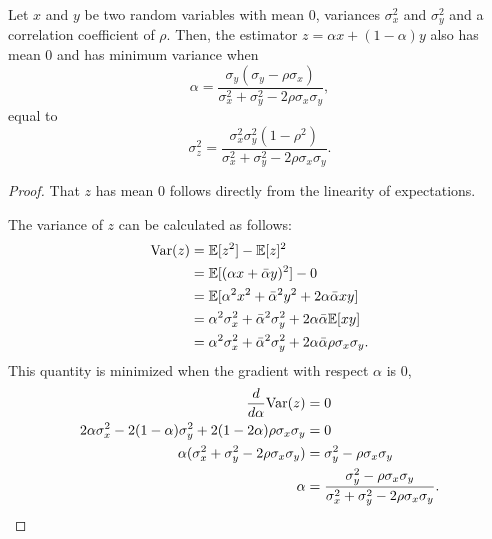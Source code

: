 \begin{lemma}
  Let $x$ and $y$ be two random variables with mean $0$, variances $\sigma^2_x$ and $\sigma^2_y$ and a correlation coefficient of $\rho$.
  Then, the estimator $z = \alpha x + (1-\alpha) y$ also has mean $0$ and has minimum variance when
  $$\alpha = \frac{\sigma_y (\sigma_y - \rho \sigma_x)}{\sigma_x^2 + \sigma_y^2 - 2\rho \sigma_x \sigma_y},$$
  equal to
  $$\sigma^2_z = \frac{\sigma_x^2 \sigma_y^2 (1 - \rho^2)}{\sigma_x^2 + \sigma_y^2 - 2 \rho \sigma_x \sigma_y}.$$
\end{lemma}
\begin{proof}
  That $z$ has mean $0$ follows directly from the linearity of expectations.

  \newcommand{\alphab}{\bar{\alpha}}

  The variance of $z$ can be calculated as follows:
  \begin{align*}
    \var(z) &= \E[z^2] - \E[z]^2 \\
            &= \E[(\alpha x+ \alphab y)^2] - 0 \\
            &= \E[\alpha^2 x^2 + \alphab^2 y^2 + 2 \alpha \alphab x y] \\
            &= \alpha^2 \sigma_x^2 + \alphab^2 \sigma_y^2 + 2 \alpha \alphab \E[x y] \\
            &= \alpha^2 \sigma_x^2 + \alphab^2 \sigma_y^2 + 2 \alpha \alphab \rho \sigma_x \sigma_y.
  \end{align*}
  This quantity is minimized when the gradient with respect $\alpha$ is $0$,
  \begin{align*}
    \frac{d}{d\alpha} \text{Var}(z) &= 0 \\
    2 \alpha \sigma_x^2 - 2(1 - \alpha) \sigma_y^2 + 2 (1 - 2\alpha) \rho \sigma_x \sigma_y &= 0\\
    \alpha (\sigma_x^2 + \sigma_y^2 - 2\rho \sigma_x \sigma_y) &= \sigma_y^2 - \rho \sigma_x \sigma_y \\
    \alpha &= \frac{\sigma_y^2 - \rho \sigma_x \sigma_y}{\sigma_x^2 + \sigma_y^2 - 2\rho \sigma_x \sigma_y}.
  \end{align*}


\end{proof}
